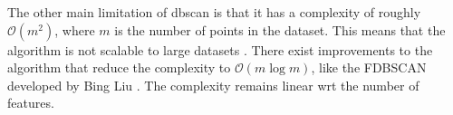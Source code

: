 The other main limitation of \gls{dbscan} is that it has a complexity of roughly $\mathcal{O}(m^2)$, where $m$ is the number of points in the dataset. This means that the algorithm is not scalable to large datasets . There exist improvements to the algorithm that reduce the complexity to $\mathcal{O}(m\log m)$, like the FDBSCAN developed by Bing Liu \cite{dbscanlogm}. The complexity remains linear \gls{wrt} the number of features.
